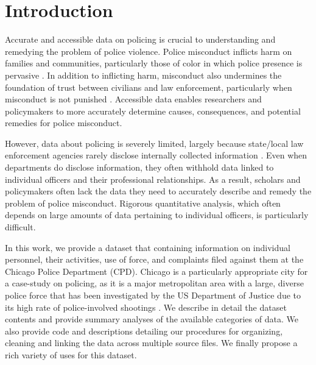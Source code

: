 

\section{Introduction} \label{sec:intro}
Accurate and accessible data on policing is crucial to understanding and
remedying the problem of police violence. Police misconduct inflicts harm on
families and communities, particularly those of color in which police presence
is pervasive \cite{Alang17}. In addition to inflicting harm, misconduct also
undermines the foundation of trust between civilians and law enforcement,
particularly when misconduct is not punished \cite{Desmond16}. Accessible data
enables researchers and policymakers to more accurately determine causes,
consequences, and potential remedies for police misconduct.

However, data about policing is severely limited, largely because state/local law
enforcement agencies rarely disclose internally collected information
\cite{Jackman21}. Even when departments do disclose information, they often
withhold data linked to individual officers and their professional
relationships.  As a result, scholars and policymakers often
lack the data they need to accurately describe and remedy the problem of police
misconduct.  Rigorous quantitative analysis, which often depends on large
amounts of data pertaining to individual officers, is particularly difficult.

In this work, we provide a dataset that containing information on
individual personnel, their activities, use of force, and complaints filed
against them at the Chicago Police Department (CPD). 
Chicago is a particularly appropriate city for a case-study on policing,
as it is a major metropolitan area with a large, diverse police force
that has been investigated by the US
Department of Justice due to its high rate of
police-involved shootings \cite{DoJ17}.
We describe in detail the
dataset contents and provide summary analyses of the available categories of
data. We also provide code and descriptions detailing our procedures for
organizing, cleaning and linking the data across multiple 
source files. We finally propose a rich variety of uses for this dataset.

